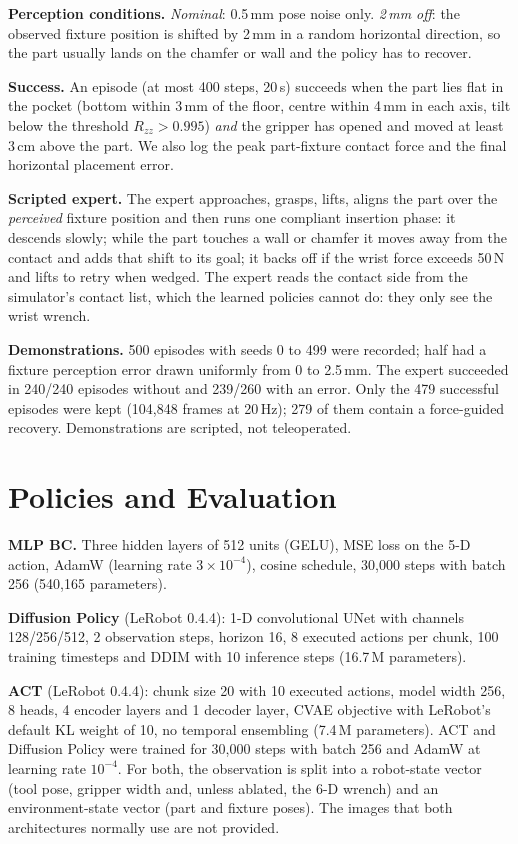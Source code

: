 \documentclass[conference]{IEEEtran}
\begin{document}
\textbf{Perception conditions.} \emph{Nominal}: 0.5\,mm pose noise only. \emph{2\,mm off}: the observed fixture position is shifted by 2\,mm in a random horizontal direction, so the part usually lands on the chamfer or wall and the policy has to recover.

\textbf{Success.} An episode (at most 400 steps, 20\,s) succeeds when the part lies flat in the pocket (bottom within 3\,mm of the floor, centre within 4\,mm in each axis, tilt below the threshold $R_{zz} > 0.995$) \emph{and} the gripper has opened and moved at least 3\,cm above the part. We also log the peak part-fixture contact force and the final horizontal placement error.

\textbf{Scripted expert.} The expert approaches, grasps, lifts, aligns the part over the \emph{perceived} fixture position and then runs one compliant insertion phase: it descends slowly; while the part touches a wall or chamfer it moves away from the contact and adds that shift to its goal; it backs off if the wrist force exceeds 50\,N and lifts to retry when wedged. The expert reads the contact side from the simulator's contact list, which the learned policies cannot do: they only see the wrist wrench.

\textbf{Demonstrations.} 500 episodes with seeds 0 to 499 were recorded; half had a fixture perception error drawn uniformly from 0 to 2.5\,mm. The expert succeeded in 240/240 episodes without and 239/260 with an error. Only the 479 successful episodes were kept (104,848 frames at 20\,Hz); 279 of them contain a force-guided recovery. Demonstrations are scripted, not teleoperated.

\section{Policies and Evaluation}
\textbf{MLP BC.} Three hidden layers of 512 units (GELU), MSE loss on the 5-D action, AdamW (learning rate $3\times10^{-4}$), cosine schedule, 30{,}000 steps with batch 256 (540{,}165 parameters).

\textbf{Diffusion Policy} (LeRobot 0.4.4): 1-D convolutional UNet with channels 128/256/512, 2 observation steps, horizon 16, 8 executed actions per chunk, 100 training timesteps and DDIM with 10 inference steps (16.7\,M parameters).

\textbf{ACT} (LeRobot 0.4.4): chunk size 20 with 10 executed actions, model width 256, 8 heads, 4 encoder layers and 1 decoder layer, CVAE objective with LeRobot's default KL weight of 10, no temporal ensembling (7.4\,M parameters). ACT and Diffusion Policy were trained for 30{,}000 steps with batch 256 and AdamW at learning rate $10^{-4}$. For both, the observation is split into a robot-state vector (tool pose, gripper width and, unless ablated, the 6-D wrench) and an environment-state vector (part and fixture poses). The images that both architectures normally use are not provided.
\end{document}
